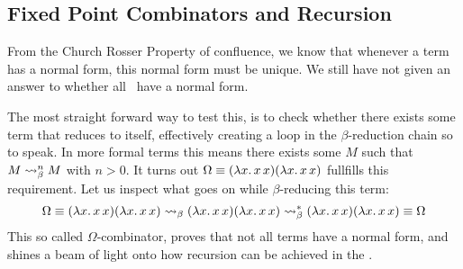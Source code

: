 \subsection{\centering Fixed Point Combinators and Recursion}
\label{sec:recursion-fixed-points}
From the Church Rosser Property of confluence, we know that whenever a term has a normal form, this normal form must be unique. We still have not given an answer to whether all \lterms \ have a normal form.

The most straight forward way to test this, is to check whether there exists some term that reduces to itself, effectively creating a loop in the $\beta$-reduction chain so to speak. In more formal terms this means there exists some $M$ such that \( M \mathrel{\leadsto}_\beta^n M \) with $ n > 0 $. It turns out \( \Omega \equiv (\lambda x . \, x \, x) (\lambda x . \, x \, x) \) fullfills this requirement. Let us inspect what goes on while $\beta$-reducing this term:
\[
  \Omega \equiv (\lambda x . \, x \, x) (\lambda x . \, x \, x) \mathrel{\leadsto}_\beta (\lambda x . \, x \, x) (\lambda x . \, x \, x) \mathrel{\leadsto}_\beta^* (\lambda x . \, x \, x) (\lambda x . \, x \, x) \equiv \Omega
\]
This so called $\Omega$-combinator, proves that not all terms have a normal form, and shines a beam of light onto how recursion can be achieved in the \lcalc.

